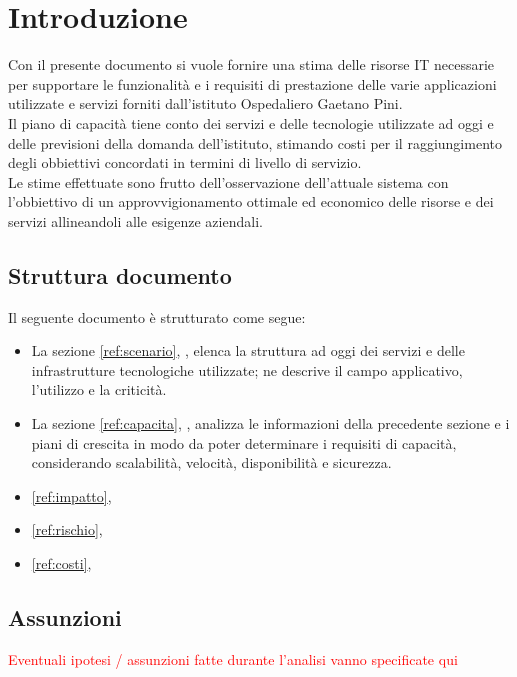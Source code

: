 \newpage

\section{Introduzione} \label{intro}
	Con il presente documento si vuole fornire una stima delle risorse IT necessarie per supportare le funzionalità e i requisiti di prestazione delle varie applicazioni utilizzate e servizi forniti dall'istituto  Ospedaliero Gaetano Pini.\\
	Il piano di capacità tiene conto dei servizi e delle tecnologie utilizzate ad oggi e delle previsioni della domanda dell'istituto, stimando costi per il raggiungimento degli obbiettivi concordati in termini di livello di servizio. \\
	Le stime effettuate sono frutto dell'osservazione dell'attuale sistema con l'obbiettivo di un approvvigionamento ottimale ed economico delle risorse e dei servizi allineandoli alle esigenze aziendali.
	
	\subsection{Struttura documento}
	Il seguente documento è strutturato come segue:
	\begin{itemize}
		\item La sezione \ref{ref:scenario}, , elenca la struttura ad oggi dei servizi e delle infrastrutture tecnologiche utilizzate; ne descrive il campo applicativo, l'utilizzo e la criticità.
		\item La sezione \ref{ref:capacita}, , analizza le informazioni della precedente sezione e i piani di crescita in modo da poter determinare i requisiti di capacità, considerando scalabilità, velocità, disponibilità e sicurezza.
		\item  \ref{ref:impatto}, 
		\item \ref{ref:rischio}, 
		\item \ref{ref:costi}, 
	\end{itemize}
	\subsection{Assunzioni}
	\textcolor{red}{Eventuali ipotesi / assunzioni fatte durante l'analisi vanno specificate qui}
